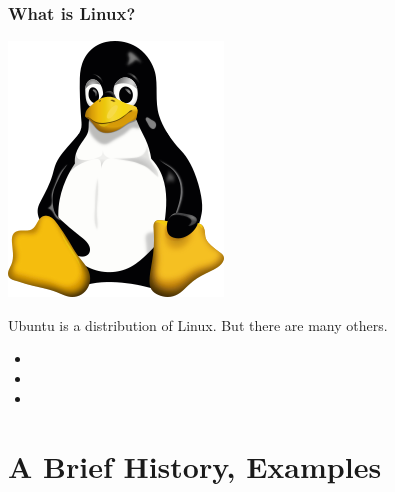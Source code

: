 \documentclass[fleqn]{beamer} %
\newcommand{\sectiontitleI}{What is Linux?} %
\newcommand{\sectiontitleII}{A Brief History, Examples}
\begin{document}
	\begin{frame} \small
		\frametitle{\sectiontitleI}
			
			\hspace*{9cm}\includegraphics[scale=.25]{Tux.png}

			Ubuntu is a {\BL distribution} of Linux. But there are many others. 
            \begin{itemize}
                \item 
                \item 
                \item 
            \end{itemize} 

	\end{frame}
		
\section{\sectiontitleII}	
\end{document}
